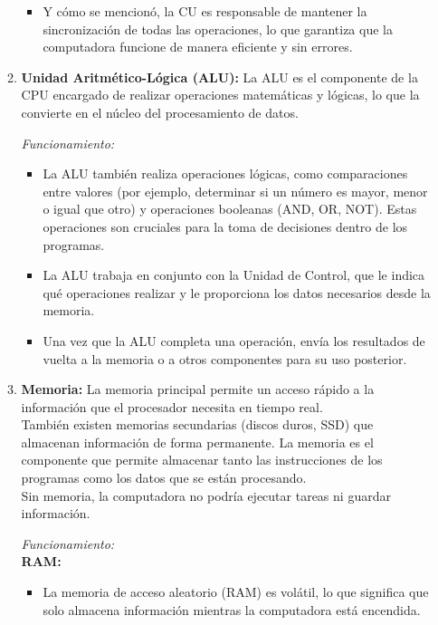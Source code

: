 \documentclass[12pt,letterpaper]{article}
\begin{document}
\begin{enumerate}
\begin{enumerate}[label=\arabic*)]
\begin{itemize}
      \item Y cómo se mencionó, la CU es responsable de mantener la sincronización de todas las operaciones, lo que garantiza que la computadora funcione de manera eficiente y sin errores.
      \end{itemize}
      
    \item \textbf{Unidad Aritmético-Lógica (ALU):}
      La ALU es el componente de la CPU encargado de realizar operaciones matemáticas y lógicas, lo que la convierte en el núcleo del procesamiento de datos.
      
      \textit{Funcionamiento:}
      \begin{itemize}
      \item La ALU también realiza operaciones lógicas, como comparaciones entre valores (por ejemplo, determinar si un número es mayor, menor o igual que otro) y operaciones booleanas (AND, OR, NOT).
        Estas operaciones son cruciales para la toma de decisiones dentro de los programas.
        
      \item La ALU trabaja en conjunto con la Unidad de Control, que le indica qué operaciones realizar y le proporciona los datos necesarios desde la memoria.
        
      \item Una vez que la ALU completa una operación, envía los resultados de vuelta a la memoria o a otros componentes para su uso posterior.
      \end{itemize}
      
    \item \textbf{Memoria:}
      La memoria principal permite un acceso rápido a la información que el procesador necesita en tiempo real.\\
      También existen memorias secundarias (discos duros, SSD) que almacenan información de forma permanente.
      La memoria es el componente que permite almacenar tanto las instrucciones de los programas como los datos que se están procesando.\\
      Sin memoria, la computadora no podría ejecutar tareas ni guardar información.
      
      \textit{Funcionamiento:}\\
      \textbf{RAM:}
      \begin{itemize}
      \item La memoria de acceso aleatorio (RAM) es volátil, lo que significa que solo almacena información mientras la computadora está encendida.
        

\end{itemize}
\end{enumerate}
\end{enumerate}
\end{document}
